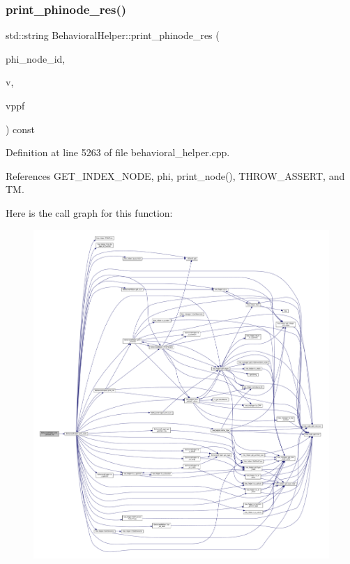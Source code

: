 \subsubsection{\texorpdfstring{print\+\_\+phinode\+\_\+res()}{print\_phinode\_res()}}
{\footnotesize\ttfamily std\+::string Behavioral\+Helper\+::print\+\_\+phinode\+\_\+res (\begin{DoxyParamCaption}\item[{unsigned int}]{phi\+\_\+node\+\_\+id,  }\item[{\hyperlink{graph_8hpp_abefdcf0544e601805af44eca032cca14}{vertex}}]{v,  }\item[{const \hyperlink{var__pp__functor_8hpp_a8a6b51b6519401d911398943510557f0}{var\+\_\+pp\+\_\+functor\+Const\+Ref}}]{vppf }\end{DoxyParamCaption}) const\hspace{0.3cm}{\ttfamily [virtual]}}



Definition at line 5263 of file behavioral\+\_\+helper.\+cpp.



References G\+E\+T\+\_\+\+I\+N\+D\+E\+X\+\_\+\+N\+O\+DE, phi, print\+\_\+node(), T\+H\+R\+O\+W\+\_\+\+A\+S\+S\+E\+RT, and TM.

Here is the call graph for this function\+:
\nopagebreak
\begin{figure}[H]
\begin{center}
\leavevmode
\includegraphics[width=350pt]{dd/db2/classBehavioralHelper_add86ad429c5bcbc95fc8a294b0fb8174_cgraph}
\end{center}
\end{figure}
\mbox{\label{classBehavioralHelper_a1a794fe146a7a2b5ab204c4819b5d94e}} 
